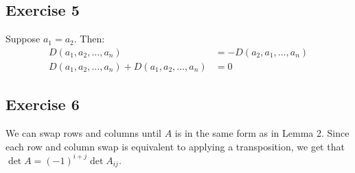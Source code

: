 \subsection{Exercise 5}
Suppose $a_1 = a_2$. Then:
\begin{align*}
        D(a_1, a_2, ..., a_n) &= -D(a_2, a_1, ..., a_n) \\
        D(a_1, a_2, ..., a_n) + D(a_1, a_2, ..., a_n) &= 0
\end{align*}

\subsection{Exercise 6}
We can swap rows and columns until $A$ is in the same form as in Lemma 2.
Since each row and column swap is equivalent to applying a transposition,
we get that $\det A = (-1)^{i + j} \det A_{ij}$.
